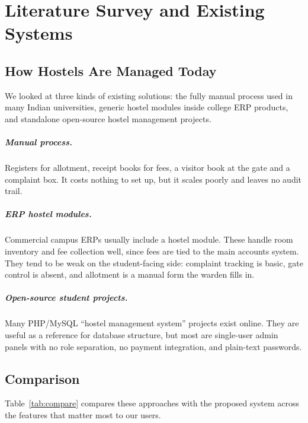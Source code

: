 \documentclass[11pt,a4paper]{report}
\begin{document}
\chapter{Literature Survey and Existing Systems}

\section{How Hostels Are Managed Today}
We looked at three kinds of existing solutions: the fully manual process used in many Indian universities, generic hostel modules inside college ERP products, and standalone open-source hostel management projects.

\paragraph{Manual process.} Registers for allotment, receipt books for fees, a visitor book at the gate and a complaint box. It costs nothing to set up, but it scales poorly and leaves no audit trail.

\paragraph{ERP hostel modules.} Commercial campus ERPs usually include a hostel module. These handle room inventory and fee collection well, since fees are tied to the main accounts system. They tend to be weak on the student-facing side: complaint tracking is basic, gate control is absent, and allotment is a manual form the warden fills in.

\paragraph{Open-source student projects.} Many PHP/MySQL ``hostel management system'' projects exist online. They are useful as a reference for database structure, but most are single-user admin panels with no role separation, no payment integration, and plain-text passwords.

\section{Comparison}
Table~\ref{tab:compare} compares these approaches with the proposed system across the features that matter most to our users.
\end{document}
